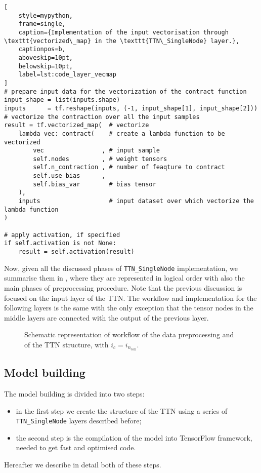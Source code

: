 \documentclass[../main/main.tex]{subfiles}
\begin{document}
\begin{lstlisting}[
    style=mypython,
    frame=single,
    caption={Implementation of the input vectorisation through \texttt{vectorized\_map} in the \texttt{TTN\_SingleNode} layer.},
    captionpos=b,
    aboveskip=10pt,
    belowskip=10pt,
    label=lst:code_layer_vecmap
]
# prepare input data for the vectorization of the contract function
input_shape = list(inputs.shape)
inputs      = tf.reshape(inputs, (-1, input_shape[1], input_shape[2]))
# vectorize the contraction over all the input samples
result = tf.vectorized_map(  # vectorize
	lambda vec: contract(    # create a lambda function to be vectorized
		vec                , # input sample
		self.nodes         , # weight tensors
		self.n_contraction , # number of feaqture to contract
		self.use_bias      , 
		self.bias_var		 # bias tensor
	), 
	inputs					 # input dataset over which vectorize the lambda function
)

# apply activation, if specified
if self.activation is not None:
    result = self.activation(result)
\end{lstlisting}


Now, given all the discussed phases of \texttt{TTN\_SingleNode} implementation, we summarise them in , where they are represented in logical order with also the main phases of preprocessing procedure. Note that the previous discussion is focused on the input layer of the TTN. The workflow and implementation for the following layers is the same with the only exception that the tensor nodes in the middle layers are connected with the output of the previous layer.

\begin{figure*}[!h]
    
    \caption{Schematic representation of workflow of the data preprocessing and of the TTN structure, with \( i_{c} = i_{n_{\mathrm{con}}} \).}
    \label{fig:code_layer_workflow}
\end{figure*}



\subsection{Model building}
\label{ssec:code_building}

The model building is divided into two steps:
\begin{itemize}
    \item in the first step we create the structure of the TTN using a series of \texttt{TTN\_SingleNode} layers described before;
    \item the second step is the compilation of the model into TensorFlow framework, needed to get fast and optimised code.
\end{itemize}
Hereafter we describe in detail both of these steps.
\end{document}
